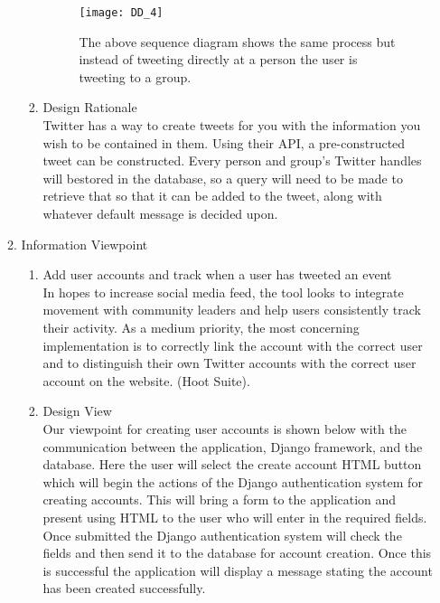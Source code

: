 \documentclass[draftclsnofoot,10pt,onecolumn]{IEEEtran} %
\begin{document}
\begin{enumerate}
\begin{enumerate}
\begin{enumerate}
				\begin{figure}[H]
  					\begin{center}
						\texttt{[image: DD\_4]}
						\captionsetup{width=.4\linewidth}
						\centering
  						\caption{The above sequence diagram shows the same process but instead of tweeting directly 
  						at a person the user is tweeting to a group.}
  					\end{center}
				\end{figure}
				
				\item Design Rationale \\
				Twitter has a way to create tweets for you with the information you wish to be contained in them. Using
				their API, a pre-constructed tweet can be constructed. Every person and group's Twitter handles will bestored in the 						database, so a query will need to be made to retrieve that so that it can be added to the tweet,
				along with whatever default message is decided upon. \\
			\end{enumerate}
			
		\item Information Viewpoint \\
			\begin{enumerate}
				\item Add user accounts and track when a user has tweeted an event \\
				In hopes to increase social media feed, the tool looks to integrate movement with community leaders and
				help users consistently track their activity. As a medium priority, the most concerning implementation is to
				correctly link the account with the correct user and to distinguish their own Twitter accounts with the
				correct user account on the website. (Hoot Suite). \\
				
				\item Design View \\ %
				Our viewpoint for creating user accounts is shown below with the communication between the application,
				Django framework, and the database. Here the user will select the create account HTML button which will
				begin the actions of the Django authentication system for creating accounts. This will bring a form to the
				application and present using HTML to the user who will enter in the required fields. Once submitted the
				Django authentication system will check the fields and then send it to the database for account creation.
				Once this is successful the application will display a message stating the account has been created
				successfully. \\
				

\end{enumerate}
\end{enumerate}
\end{enumerate}
\end{document}
